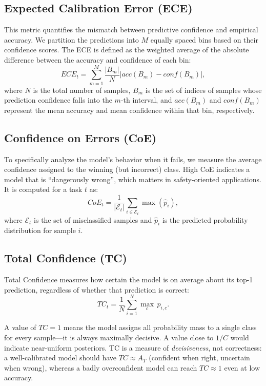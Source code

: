 \subsection{Expected Calibration Error (ECE)}
This metric quantifies the mismatch between predictive confidence and empirical accuracy. We partition the predictions into $M$ equally spaced bins based on their confidence scores. The ECE is defined as the weighted average of the absolute difference between the accuracy and confidence of each bin:
\begin{equation}
	ECE_t = \sum_{m=1}^{M} \frac{|B_m|}{N} \left| acc(B_m) - conf(B_m) \right|,\label{eq_ECE}
\end{equation}
where $N$ is the total number of samples, $B_m$ is the set of indices of samples whose prediction confidence falls into the $m$-th interval, and $acc(B_m)$ and $conf(B_m)$ represent the mean accuracy and mean confidence within that bin, respectively.

\subsection{Confidence on Errors (CoE)}
To specifically analyze the model's behavior when it fails, we measure the average confidence assigned to the winning (but incorrect) class. High CoE indicates a model that is ``dangerously wrong'', which matters in safety-oriented applications. It is computed for a task $t$ as:
\begin{equation}
	CoE_t = \frac{1}{|\mathcal{E}_t|} \sum_{i \in \mathcal{E}_t} \max(\hat{p}_i),
\end{equation}
where $\mathcal{E}_t$ is the set of misclassified samples and $\hat{p}_i$ is the predicted probability distribution for sample $i$.

\subsection{Total Confidence (TC)}

Total Confidence measures how certain the model is on average about its top-1 prediction, regardless of whether that prediction is correct:
\begin{equation}
	TC_t = \frac{1}{N} \sum_{i=1}^{N} \max_{c} \, p_{i,c}.
\end{equation}

A value of $TC=1$ means the model assigns all probability mass to a single class for every sample---it is always maximally decisive. A value close to $1/C$ would indicate near-uniform posteriors. TC is a measure of \emph{decisiveness}, not correctness: a well-calibrated model should have $TC \approx A_T$ (confident when right, uncertain when wrong), whereas a badly overconfident model can reach $TC \approx 1$ even at low accuracy.

